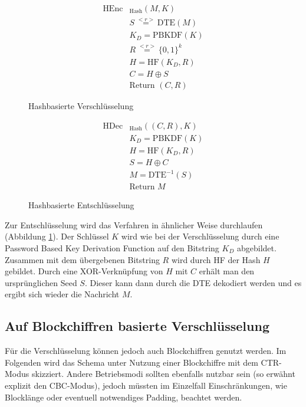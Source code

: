 \begin{figure}[h]
	\begin{minipage}[b]{0.5\textwidth}
		\begin{align*}
			\text{HEnc}&_{\text{Hash}}(M, K)\\
			&S \overset{<r>}{=} \text{DTE}(M)\\ 	%
			&K_D = \text{PBKDF}(K)\\ 		%
			&R \overset{<r>}{=} \{0,1\}^k\\	%
			&H = \text{HF}(K_D,R)\\	%
			&C = H \oplus S\\	%
			&\text{Return } (C,R)
		\end{align*}
		\caption{Hashbasierte Verschlüsselung}
		\label{fig:HashEnc}
	\end{minipage}
	\begin{minipage}[b]{0.5\textwidth}
		\begin{align*}
			\text{HDec}&_{\text{Hash}}((C,R), K)\\
			&K_D = \text{PBKDF}(K)\\ 		%
			&H = \text{HF}(K_D,R)\\	%
			&S = H \oplus C\\	%
			&M = \text{DTE}^{-1}(S)\\ 	%
			&\text{Return } M
		\end{align*}
		\caption{Hashbasierte Entschlüsselung}
		\label{fig:HashDec}
	\end{minipage}
\end{figure}

Zur Entschlüsselung wird das Verfahren in ähnlicher Weise durchlaufen (Abbildung \ref{fig:HashDec}). Der Schlüssel \(K\) wird wie bei der Verschlüsselung durch eine Password Based Key Derivation Function auf den Bitstring \(K_D\) abgebildet. Zusammen mit dem übergebenen Bitstring \(R\) wird durch HF der Hash \(H\) gebildet. Durch eine XOR-Verknüpfung von \(H\) mit \(C\) erhält man den ursprünglichen Seed \(S\). Dieser kann dann durch die DTE  dekodiert werden und es ergibt sich wieder die Nachricht \(M\).

\subsection{Auf Blockchiffren basierte Verschlüsselung}

Für die Verschlüsselung können jedoch auch Blockchiffren genutzt werden. Im Folgenden wird das Schema unter Nutzung einer Blockchiffre mit dem CTR-Modus skizziert. Andere Betriebsmodi sollten ebenfalls nutzbar sein (so erwähnt \cite{EURO2014} explizit den CBC-Modus), jedoch müssten im Einzelfall Einschränkungen, wie Blocklänge oder eventuell notwendiges Padding, beachtet werden. 

